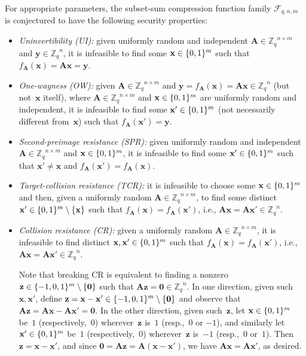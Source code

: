 \documentclass[11pt]{article}
\newcommand{\Z}{\ensuremath{\mathbb{Z}}}
\newcommand{\Zq}{\ensuremath{\Z_q}}
\DeclarePairedDelimiter\set{\{}{\}}
\newcommand{\matA}{\ensuremath{\mathbf{A}}}
\newcommand{\vecx}{\ensuremath{\mathbf{x}}}
\newcommand{\vecy}{\ensuremath{\mathbf{y}}}
\newcommand{\vecz}{\ensuremath{\mathbf{z}}}
\newcommand{\veczero}{\ensuremath{\mathbf{0}}}
\numberwithin{equation}{section}
\newcommand{\bit}{\ensuremath{\set{0,1}}}
\renewcommand{\cal}[1]{\mathcal{#1}}
\begin{document}
For appropriate parameters, the subset-sum compression function family
$\cal F_{q,n,m}$ is conjectured to have the following security
properties:
\begin{itemize}
\item \emph{Uninvertibility (UI):} given uniformly random and
  independent $\matA \in \Zq^{n \times m}$ and $\vecy \in \Zq^{n}$, it
  is infeasible to find some $\vecx \in \bit^{m}$ such that
  $f_{\matA}(\vecx) = \matA \vecx = \vecy$.

\item \emph{One-wayness (OW):} given $\matA \in \Zq^{n \times m}$ and
  $\vecy = f_{\matA}(\vecx) = \matA \vecx \in \Zq^{n}$ (but
  not~$\vecx$ itself), where $\matA \in \Zq^{n \times m}$ and
  $\vecx \in \bit^{m}$ are uniformly random and independent, it is
  infeasible to find some $\vecx' \in \bit^{m}$ (not necessarily
  different from~$\vecx$) such that $f_{\matA}(\vecx') = \vecy$.

\item \emph{Second-preimage resistance (SPR):} given uniformly random
  and independent $\matA \in \Zq^{n \times m}$ and
  $\vecx \in \bit^{m}$, it is infeasible to find some
  $\vecx' \in \bit^{m}$ such that $\vecx' \neq \vecx$ and
  $f_{\matA}(\vecx') = f_{\matA}(\vecx)$.

\item \emph{Target-collision resistance (TCR):} it is infeasible to
  choose some $\vecx \in \bit^{m}$ and then, given a uniformly random
  $\matA \in \Zq^{n \times m}$, to find some distinct
  $\vecx' \in \bit^{m} \setminus \set{\vecx}$ such that
  $f_{\matA}(\vecx) = f_{\matA}(\vecx')$, i.e.,
  $\matA \vecx = \matA \vecx' \in \Zq^{n}$.

\item \emph{Collision resistance (CR):} given a uniformly random
  $\matA \in \Zq^{n \times m}$, it is infeasible to find distinct
  $\vecx, \vecx' \in \bit^{m}$ such that
  $f_{\matA}(\vecx) = f_{\matA}(\vecx')$, i.e.,
  $\matA \vecx = \matA \vecx' \in \Zq^{n}$.

  Note that breaking CR is equivalent to finding a nonzero
  $\vecz \in \set{-1, 0, 1}^{m} \setminus \set{\veczero}$ such that
  $\matA \vecz = \veczero \in \Zq^{n}$. In one direction, given such
  $\vecx, \vecx'$, define
  $\vecz = \vecx - \vecx' \in \set{-1, 0, 1}^{m} \setminus
  \set{\veczero}$ and observe that
  $\matA \vecz = \matA \vecx - \matA \vecx' = \veczero$. In the other
  direction, given such~$\vecz$, let $\vecx \in \bit^{m}$ be~$1$
  (respectively,~$0$) wherever~$\vecz$ is~$1$ (resp.,~$0$ or $-1$),
  and similarly let $\vecx' \in \bit^{m}$ be~$1$ (respectively,~$0$)
  wherever~$\vecz$ is~$-1$ (resp.,~$0$ or~$1$). Then
  $\vecz = \vecx - \vecx'$, and since
  $\veczero = \matA \vecz = \matA(\vecx - \vecx')$, we have
  $\matA \vecx = \matA \vecx'$, as desired.
\end{itemize}
\end{document}
